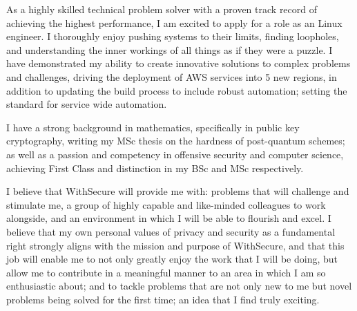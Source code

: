 \documentclass[11pt, a4paper]{awesome-cv} %
\begin{document}
\makecvheader %

\makelettertitle %


\begin{cvletter}



As a highly skilled technical problem solver with a proven track record of achieving the highest performance, I am excited to apply for a role as an Linux engineer. I thoroughly enjoy pushing systems to their limits, finding loopholes, and understanding the inner workings of all things as if they were a puzzle. I have demonstrated my ability to create innovative solutions to complex problems and challenges, driving the deployment of AWS services into 5 new regions, in addition to updating the build process to include robust automation; setting the standard for service wide automation. 

I have a strong background in mathematics, specifically in public key cryptography, writing my MSc thesis on the hardness of post-quantum schemes; as well as a passion and competency in offensive security and computer science, achieving First Class and distinction in my BSc and MSc respectively.



I believe that WithSecure will provide me with: problems that will challenge and stimulate me, a group of highly capable and like-minded colleagues to work alongside, and an environment in which I will be able to flourish and excel. I believe that my own personal values of privacy and security as a fundamental right strongly aligns with the mission and purpose of WithSecure, and that this job will enable me to not only greatly enjoy the work that I will be doing, but allow me to contribute in a meaningful manner to an area in which I am so enthusiastic about; and to tackle problems that are not only new to me but novel problems being solved for the first time; an idea that I find truly exciting.



\end{cvletter}
\end{document}
